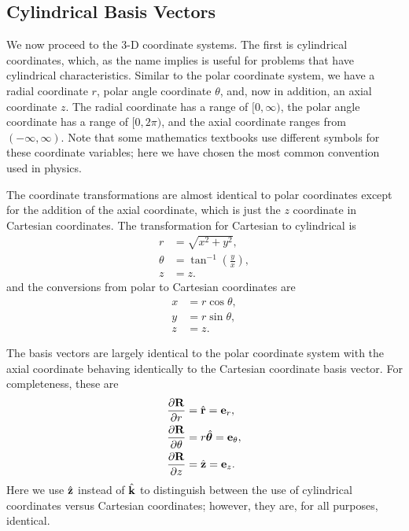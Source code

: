 \subsection{Cylindrical Basis Vectors}

We now proceed to the 3-D coordinate systems. The first is cylindrical coordinates, which, as the name implies is useful for problems that have cylindrical characteristics. Similar to the polar coordinate system, we have a radial coordinate $r$, polar angle coordinate $\theta$, and, now in addition, an axial coordinate $z$. The radial coordinate has a range of $[0,\infty)$, the polar angle coordinate has a range of $[0,2\pi)$, and the axial coordinate ranges from $(-\infty,\infty)$. Note that some mathematics textbooks use different symbols for these coordinate variables; here we have chosen the most common convention used in physics.

The coordinate transformations are almost identical to polar coordinates except for the addition of the axial coordinate, which is just the $z$ coordinate in Cartesian coordinates. The transformation for Cartesian to cylindrical is
\begin{subequations}
\begin{align}
  r &= \sqrt{ x^2 + y^2 }, \\
  \theta &= \tan^{-1} \left( \frac{y}{x} \right) , \\
  z &= z.
\end{align}
\end{subequations}
and the conversions from polar to Cartesian coordinates are
\begin{subequations}
\begin{align}
  x &= r \cos \theta , \\
  y &= r \sin \theta , \\
  z &= z .
\end{align}
\end{subequations}

The basis vectors are largely identical to the polar coordinate system with the axial coordinate behaving identically to the Cartesian coordinate basis vector. For completeness, these are
\begin{subequations}
\begin{align}
  \frac{ \partial {\mathbf{R}} }{ \partial {r} } &= \hat{\mathbf{r}} = \mathbf{e}_r, \\
  \frac{ \partial {\mathbf{R}} }{ \partial {\theta} } &= r \hat{\boldsymbol\theta} = \mathbf{e}_\theta, \\ 
  \frac{ \partial {\mathbf{R}} }{ \partial {z} } &= \hat{\mathbf{z}} = \mathbf{e}_z.
\end{align}
\end{subequations}
Here we use $\hat{\mathbf{z}}$ instead of $\hat{\mathbf{k}}$ to distinguish between the use of cylindrical coordinates versus Cartesian coordinates; however, they are, for all purposes, identical.

